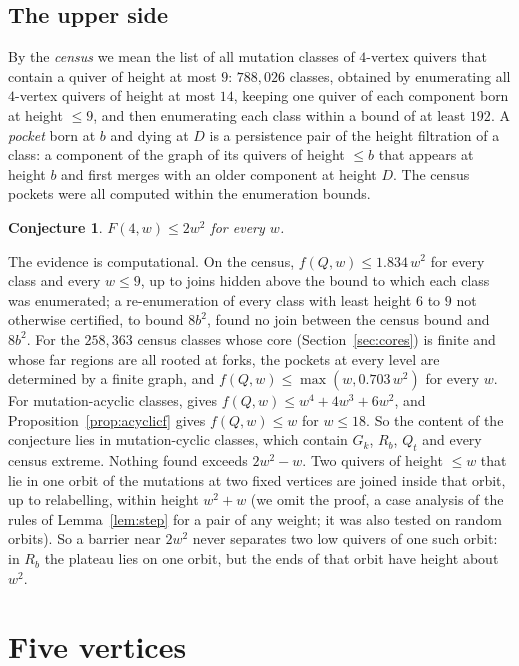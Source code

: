 \documentclass[11pt]{amsart}
\newtheorem{conjecture}[theorem]{Conjecture}
\theoremstyle{definition}
\theoremstyle{remark}
\begin{document}
\subsection{The upper side}\label{sec:upper}
By the \emph{census} we mean the list of all mutation classes of $4$-vertex quivers that contain a quiver of height at most $9$: $788{,}026$ classes, obtained by enumerating all $4$-vertex quivers of height at most $14$, keeping one quiver of each component born at height $\le9$, and then enumerating each class within a bound of at least $192$. A \emph{pocket} born at $b$ and dying at $D$ is a persistence pair of the height filtration of a class: a component of the graph of its quivers of height $\le b$ that appears at height $b$ and first merges with an older component at height $D$. The census pockets were all computed within the enumeration bounds.

\begin{conjecture}\label{conj:2w2}
$F(4,w)\le2w^2$ for every $w$.
\end{conjecture}

The evidence is computational. On the census, $f(Q,w)\le1.834\,w^2$ for every class and every $w\le9$, up to joins hidden above the bound to which each class was enumerated; a re-enumeration of every class with least height $6$ to $9$ not otherwise certified, to bound $8b^2$, found no join between the census bound and $8b^2$. For the $258{,}363$ census classes whose core (Section~\ref{sec:cores}) is finite and whose far regions are all rooted at forks, the pockets at every level are determined by a finite graph, and $f(Q,w)\le\max(w,0.703\,w^2)$ for every $w$. For mutation-acyclic classes, \cite{AHJL} gives $f(Q,w)\le w^4+4w^3+6w^2$, and Proposition~\ref{prop:acyclicf} gives $f(Q,w)\le w$ for $w\le18$. So the content of the conjecture lies in mutation-cyclic classes, which contain $G_k$, $R_b$, $Q_t$ and every census extreme. Nothing found exceeds $2w^2-w$. Two quivers of height $\le w$ that lie in one orbit of the mutations at two fixed vertices are joined inside that orbit, up to relabelling, within height $w^2+w$ (we omit the proof, a case analysis of the rules of Lemma~\ref{lem:step} for a pair of any weight; it was also tested on random orbits). So a barrier near $2w^2$ never separates two low quivers of one such orbit: in $R_b$ the plateau lies on one orbit, but the ends of that orbit have height about $w^2$.

\section{Five vertices}\label{sec:five}
\end{document}
